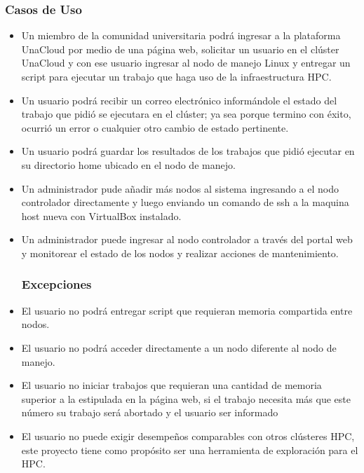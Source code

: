 \subsubsection{Casos de Uso}
\begin{itemize}
    \item Un miembro de la comunidad universitaria podrá ingresar a la plataforma UnaCloud por medio de una página web, solicitar un usuario en el clúster UnaCloud y con ese usuario ingresar al nodo de manejo Linux y entregar un script para ejecutar un trabajo que haga uso de la infraestructura HPC.
    \item Un usuario podrá recibir un correo electrónico informándole el estado del trabajo que pidió se ejecutara en el clúster; ya sea porque termino con éxito, ocurrió un error o cualquier otro cambio de estado pertinente.
    \item Un usuario podrá guardar los resultados de los trabajos que pidió ejecutar en su directorio home ubicado en el nodo de manejo.
    \item Un administrador pude añadir más nodos al sistema ingresando a el nodo controlador directamente y luego enviando un comando de ssh a la maquina host nueva con VirtualBox instalado.
    \item Un administrador puede ingresar al nodo controlador a través del portal web y monitorear el estado de los nodos y realizar acciones de mantenimiento.
\subsubsection{Excepciones}
    \item El usuario no podrá entregar script que requieran memoria compartida entre nodos.
    \item El usuario no podrá acceder directamente a un nodo diferente al nodo de manejo.
    \item El usuario no iniciar trabajos que requieran una cantidad de memoria superior a la estipulada en la página web, si el trabajo necesita más que este número su trabajo será abortado y el usuario ser informado
    \item El usuario no puede exigir desempeños comparables con otros clústeres HPC, este proyecto tiene como propósito ser una herramienta de exploración para el HPC.
\end{itemize}
